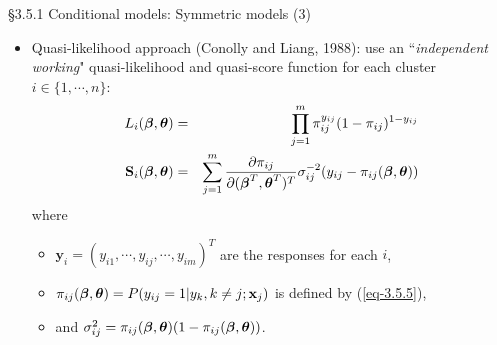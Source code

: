 \documentclass{beamer}
\newenvironment{wideitemize}%
  {\begin{itemize}%
    \setlength{\parskip}{1em}}%
  {\end{itemize}}
\begin{document}
\begin{frame}{\S3.5.1 Conditional models: Symmetric models (3)}
\begin{itemize}

\item
Quasi-likelihood approach (Conolly and Liang, 1988):  use an ``\textit{independent
working}" quasi-likelihood and quasi-score function for each cluster $i \in \{1,\cdots, n\}$:
\begin{eqnarray*}
L_i(\mbox{\boldmath $\beta$}, \mbox{\boldmath $\theta$}) &=& \prod_{j=1}^m\pi_{ij}^{y_{ij}}
(1-\pi_{ij})^{1-y_{ij}} \\
\textbf{S}_i(\mbox{\boldmath $\beta$}, \mbox{\boldmath $\theta$}) &=& \sum_{j=1}^m
\frac{\partial \pi_{ij}}{\partial (\mbox{\boldmath $\beta$}^T, \mbox{\boldmath $\theta$}^T)^T}
\sigma_{ij}^{-2}(y_{ij}-\pi_{ij}(\mbox{\boldmath $\beta$}, \mbox{\boldmath $\theta$}))
\end{eqnarray*}
where
\begin{wideitemize}
\item 
 $\textbf{y}_i=(y_{i1},\cdots,y_{ij},\cdots, y_{im})^T$ are the responses for each $i$,
\item $\pi_{ij}(\mbox{\boldmath $\beta$}, \mbox{\boldmath $\theta$})=P(y_{ij}=1|y_k, k\neq j; \textbf{x}_j)$ is defined
by (\ref{eq-3.5.5}), 
\item and $\sigma^2_{ij}=\pi_{ij}(\mbox{\boldmath $\beta$}, \mbox{\boldmath $\theta$})
(1-\pi_{ij}(\mbox{\boldmath $\beta$}, \mbox{\boldmath $\theta$}))$.
\end{wideitemize}
\end{itemize}

\end{frame}



\end{document}
